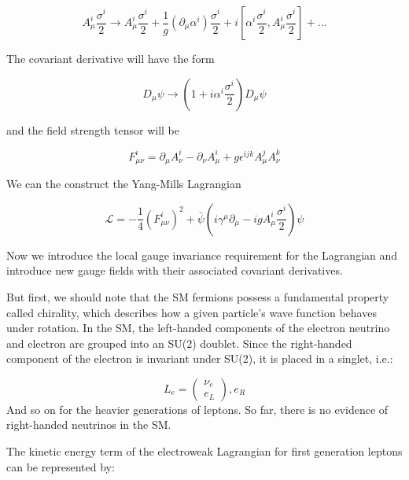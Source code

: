 \begin{equation}
A_{\mu}^{i}\frac{\sigma^{i}}{2}\rightarrow A_{\mu}^{i}\frac{\sigma^{i}}{2} + \frac{1}{g}(\partial_{\mu}\alpha^{i})\frac{\sigma^{i}}{2} + i[\alpha^{i}\frac{\sigma^{i}}{2}, A_{\mu}^{i}\frac{\sigma^{i}}{2}] + ...
\end{equation}

The covariant derivative will have the form

\begin{equation}
D_{\mu}\psi\rightarrow(1+i\alpha^{i}\frac{\sigma^{i}}{2})D_{\mu}\psi
\end{equation}

and the field strength tensor will be

\begin{equation}
F_{\mu\nu}^{i} = \partial_{\mu}A_{\nu}^{i} - \partial_{\nu}A_{\mu}^{i} + g\epsilon^{ijk}A_{\mu}^{j}A_{\nu}^{k}
\end{equation}

We can the construct the Yang-Mills Lagrangian

\begin{equation}
\mathcal{L} = -\frac{1}{4}(F_{\mu\nu}^{i})^{2}+\bar{\psi}(i\gamma^{\mu}\partial_{\mu}-igA_{\mu}^{i}\frac{\sigma^{i}}{2})\psi
\end{equation}

Now we introduce the local gauge invariance requirement for the Lagrangian and introduce new gauge fields with their associated covariant derivatives.

But first, we should note that the SM fermions possess a fundamental property called chirality, which describes how a given particle's wave function behaves under rotation. In the SM, the left-handed components of the electron neutrino and electron are grouped into an SU(2) doublet. Since the right-handed component of the electron is invariant under SU(2), it is placed in a singlet, i.e.:

\begin{equation}
L_{e} = \begin{pmatrix}
	\nu_{e} \\
	e_{L}
\end{pmatrix}
, e_{R}
\end{equation}
 And so on for the heavier generations of leptons. So far, there is no evidence of right-handed neutrinos in the SM.

 The kinetic energy term of the electroweak Lagrangian for first generation leptons can be represented by:

